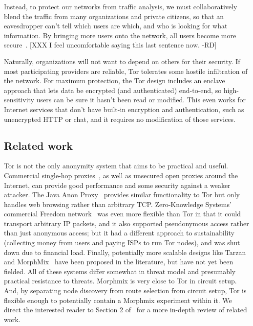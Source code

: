 \documentclass{llncs}
\begin{document}
Instead, to protect our networks from traffic analysis, we must
collaboratively blend the traffic from many organizations and private
citizens, so that an eavesdropper can't tell which users are which,
and who is looking for what information.  By bringing more users onto
the network, all users become more secure~\cite{econymics}.
[XXX I feel uncomfortable saying this last sentence now. -RD]

Naturally, organizations will not want to depend on others for their
security.  If most participating providers are reliable, Tor tolerates
some hostile infiltration of the network.  For maximum protection,
the Tor design includes an enclave approach that lets data be encrypted
(and authenticated) end-to-end, so high-sensitivity users can be sure it
hasn't been read or modified.  This even works for Internet services that
don't have built-in encryption and authentication, such as unencrypted
HTTP or chat, and it requires no modification of those services.

\subsection{Related work}
Tor is not the only anonymity system that aims to be practical and useful.
Commercial single-hop proxies~\cite{anonymizer}, as well as unsecured
open proxies around the Internet, can provide good
performance and some security against a weaker attacker. The Java
Anon Proxy~\cite{web-mix} provides similar functionality to Tor but only
handles web browsing rather than arbitrary TCP\@.
Zero-Knowledge Systems' commercial Freedom
network~\cite{freedom21-security} was even more flexible than Tor in
that it could transport arbitrary IP packets, and it also supported
pseudonymous access rather than just anonymous access; but it had
a different approach to sustainability (collecting money from users
and paying ISPs to run Tor nodes), and was shut down due to financial
load.  Finally, potentially
more scalable designs like Tarzan~\cite{tarzan:ccs02} and
MorphMix~\cite{morphmix:fc04} have been proposed in the literature, but
have not yet been fielded. All of these systems differ somewhat
in threat model and presumably practical resistance to threats.
Morphmix is very close to Tor in circuit setup. And, by separating
node discovery from route selection from circuit setup, Tor is
flexible enough to potentially contain a Morphmix experiment within
it. We direct the interested reader to Section
2 of~\cite{tor-design} for a more in-depth review of related work.
\end{document}
